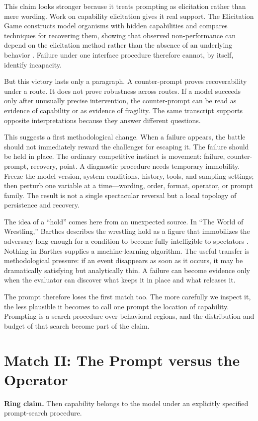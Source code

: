 \documentclass[11pt]{article}
\newcommand{\ringclaim}[1]{\vspace{0.35em}\noindent\textbf{Ring claim.} #1\vspace{0.15em}}
\begin{document}
This claim looks stronger because it treats prompting as elicitation rather than mere wording. Work on capability elicitation gives it real support. The Elicitation Game constructs model organisms with hidden capabilities and compares techniques for recovering them, showing that observed non-performance can depend on the elicitation method rather than the absence of an underlying behavior \cite{hofstatter2025elicitation}. Failure under one interface procedure therefore cannot, by itself, identify incapacity.

But this victory lasts only a paragraph. A counter-prompt proves recoverability under a route. It does not prove robustness across routes. If a model succeeds only after unusually precise intervention, the counter-prompt can be read as evidence of capability or as evidence of fragility. The same transcript supports opposite interpretations because they answer different questions.

This suggests a first methodological change. When a failure appears, the battle should not immediately reward the challenger for escaping it. The failure should be held in place. The ordinary competitive instinct is movement: failure, counter-prompt, recovery, point. A diagnostic procedure needs temporary immobility. Freeze the model version, system conditions, history, tools, and sampling settings; then perturb one variable at a time---wording, order, format, operator, or prompt family. The result is not a single spectacular reversal but a local topology of persistence and recovery.

The idea of a ``hold'' comes here from an unexpected source. In ``The World of Wrestling,'' Barthes describes the wrestling hold as a figure that immobilizes the adversary long enough for a condition to become fully intelligible to spectators \cite{barthes1972wrestling}. Nothing in Barthes supplies a machine-learning algorithm. The useful transfer is methodological pressure: if an event disappears as soon as it occurs, it may be dramatically satisfying but analytically thin. A failure can become evidence only when the evaluator can discover what keeps it in place and what releases it.

The prompt therefore loses the first match too. The more carefully we inspect it, the less plausible it becomes to call one prompt the location of capability. Prompting is a search procedure over behavioral regions, and the distribution and budget of that search become part of the claim.

\section{Match II: The Prompt versus the Operator}
\ringclaim{Then capability belongs to the model under an explicitly specified prompt-search procedure.}
\end{document}
